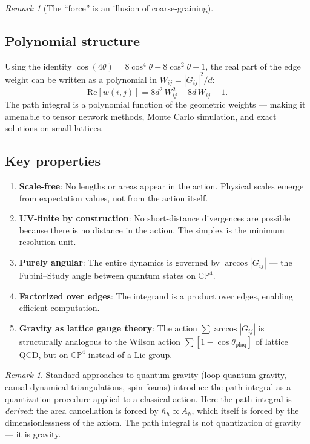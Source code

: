 \documentclass[12pt]{article}
\theoremstyle{remark}
\newtheorem{remark}[theorem]{Remark}
\theoremstyle{definition}
\begin{document}
\begin{remark}[The ``force'' is an illusion of coarse-graining]
\subsection{Polynomial structure}

Using the identity $\cos(4\theta) = 8\cos^4\theta - 8\cos^2\theta + 1$, the real part of the edge weight can be written as a polynomial in $W_{ij} = |G_{ij}|^2/d$:
\begin{equation}
\text{Re}[w(i,j)] = 8d^2\,W_{ij}^2 - 8d\,W_{ij} + 1.
\end{equation}
The path integral is a polynomial function of the geometric weights --- making it amenable to tensor network methods, Monte Carlo simulation, and exact solutions on small lattices.

\subsection{Key properties}

\begin{enumerate}
\item \textbf{Scale-free}: No lengths or areas appear in the action. Physical scales emerge from expectation values, not from the action itself.

\item \textbf{UV-finite by construction}: No short-distance divergences are possible because there is no distance in the action. The simplex is the minimum resolution unit.

\item \textbf{Purely angular}: The entire dynamics is governed by $\arccos|G_{ij}|$ --- the Fubini--Study angle between quantum states on $\mathbb{CP}^4$.

\item \textbf{Factorized over edges}: The integrand is a product over edges, enabling efficient computation.

\item \textbf{Gravity as lattice gauge theory}: The action $\sum\arccos|G_{ij}|$ is structurally analogous to the Wilson action $\sum[1 - \cos\theta_\text{plaq}]$ of lattice QCD, but on $\mathbb{CP}^4$ instead of a Lie group.
\end{enumerate}

\begin{remark}
Standard approaches to quantum gravity (loop quantum gravity, causal dynamical triangulations, spin foams) introduce the path integral as a quantization procedure applied to a classical action. Here the path integral is \emph{derived}: the area cancellation is forced by $\hbar_h \propto A_h$, which itself is forced by the dimensionlessness of the axiom. The path integral is not quantization of gravity --- it is gravity.
\end{remark}


\end{remark}
\end{document}
